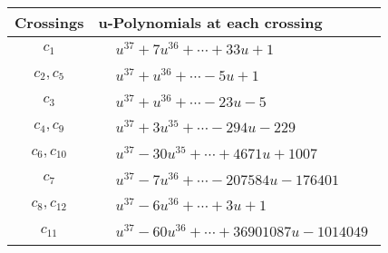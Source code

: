 \documentclass[1p]{elsarticle_modified}
\theoremstyle{definition}
\begin{document}
\begin{tabular}{m{50pt}|m{274pt}}
Crossings & \hspace{64pt}u-Polynomials at each crossing \\
\hline $$\begin{aligned}c_{1}\end{aligned}$$&$\begin{aligned}
&u^{37}+7 u^{36}+\cdots+33 u+1
\end{aligned}$\\
\hline $$\begin{aligned}c_{2},c_{5}\end{aligned}$$&$\begin{aligned}
&u^{37}+u^{36}+\cdots-5 u+1
\end{aligned}$\\
\hline $$\begin{aligned}c_{3}\end{aligned}$$&$\begin{aligned}
&u^{37}+u^{36}+\cdots-23 u-5
\end{aligned}$\\
\hline $$\begin{aligned}c_{4},c_{9}\end{aligned}$$&$\begin{aligned}
&u^{37}+3 u^{35}+\cdots-294 u-229
\end{aligned}$\\
\hline $$\begin{aligned}c_{6},c_{10}\end{aligned}$$&$\begin{aligned}
&u^{37}-30 u^{35}+\cdots+4671 u+1007
\end{aligned}$\\
\hline $$\begin{aligned}c_{7}\end{aligned}$$&$\begin{aligned}
&u^{37}-7 u^{36}+\cdots-207584 u-176401
\end{aligned}$\\
\hline $$\begin{aligned}c_{8},c_{12}\end{aligned}$$&$\begin{aligned}
&u^{37}-6 u^{36}+\cdots+3 u+1
\end{aligned}$\\
\hline $$\begin{aligned}c_{11}\end{aligned}$$&$\begin{aligned}
&u^{37}-60 u^{36}+\cdots+36901087 u-1014049
\end{aligned}$\\
\hline
\end{tabular}\\~\\
\end{document}
